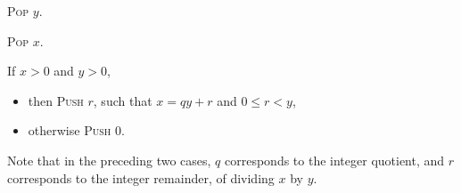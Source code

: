 \documentclass[a4paper,12pt]{article}
\newcommand{\proc}[1]{\textsc{#1}}
\theoremstyle{definition}
\begin{document}
\begin{stepnumbers}[start=3]
\begin{description}
\begin{stepnumbers}
    \item \proc{Pop} $y$.
    \item \proc{Pop} $x$.
    \item If $x > 0$ and $y > 0$,
      \begin{itemize}[label=]
      \item then \proc{Push} $r$, such that $x = qy + r$ and $0 \leq r < y$,
      \item otherwise \proc{Push} 0.
      \end{itemize}
    \end{stepnumbers}
  \end{description}
\end{stepnumbers}
Note that in the preceding two cases, $q$ corresponds to the integer quotient, and $r$ corresponds to the integer remainder, of dividing $x$ by $y$.
\end{document}

